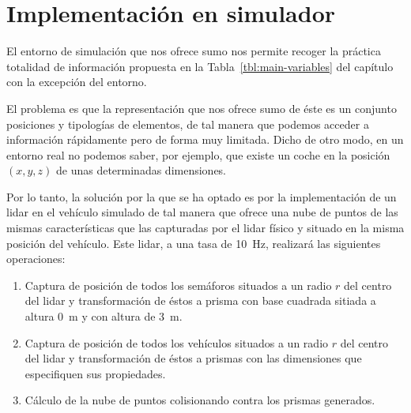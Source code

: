 \chapter{Implementación en simulador}
\label{ch:simulation-implementation}

El entorno de simulación que nos ofrece \gls{sumo} nos permite recoger la práctica totalidad de información propuesta en la Tabla~\ref{tbl:main-variables} del capítulo  con la excepción del entorno.

El problema es que la representación que nos ofrece \gls{sumo} de éste es un conjunto posiciones y tipologías de elementos, de tal manera que podemos acceder a información rápidamente pero de forma muy limitada. Dicho de otro modo, en un entorno real no podemos saber, por ejemplo, que existe un coche en la posición $(x, y, z)$ de unas determinadas dimensiones.

Por lo tanto, la solución por la que se ha optado es por la implementación de un \acrshort{lidar} en el vehículo simulado de tal manera que ofrece una nube de puntos de las mismas características que las capturadas por el \acrshort{lidar} físico y situado en la misma posición del vehículo. Este \acrshort{lidar}, a una tasa de \SI{10}{\hertz}, realizará las siguientes operaciones:

\begin{enumerate}
	\item Captura de posición de todos los semáforos situados a un radio $r$ del centro del \acrshort{lidar} y transformación de éstos a prisma con base cuadrada sitiada a altura \SI{0}{\meter} y con altura de \SI{3}{\meter}.
	\item Captura de posición de todos los vehículos situados a un radio $r$ del centro del \acrshort{lidar} y transformación de éstos a prismas con las dimensiones que especifiquen sus propiedades.
	\item Cálculo de la nube de puntos colisionando contra los prismas generados.
\end{enumerate}

